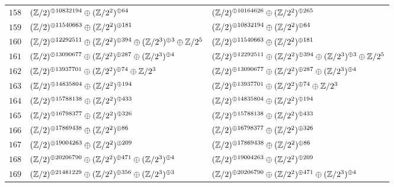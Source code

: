 \begin{supertabular}{|c|p{5.5cm}|p{5.5cm}|}
$158$%
&$(\mathbb{Z}/2)^{\oplus10832194}\oplus(\mathbb{Z}/2^{2})^{\oplus64}$%
&$(\mathbb{Z}/2)^{\oplus10164626}\oplus(\mathbb{Z}/2^{2})^{\oplus265}$\\

$159$%
&$(\mathbb{Z}/2)^{\oplus11540663}\oplus(\mathbb{Z}/2^{2})^{\oplus181}$%
&$(\mathbb{Z}/2)^{\oplus10832194}\oplus(\mathbb{Z}/2^{2})^{\oplus64}$\\

$160$%
&$(\mathbb{Z}/2)^{\oplus12292511}\oplus(\mathbb{Z}/2^{2})^{\oplus394}\oplus(\mathbb{Z}/2^{3})^{\oplus3}\oplus\mathbb{Z}/2^{5}$%
&$(\mathbb{Z}/2)^{\oplus11540663}\oplus(\mathbb{Z}/2^{2})^{\oplus181}$\\

$161$%
&$(\mathbb{Z}/2)^{\oplus13090677}\oplus(\mathbb{Z}/2^{2})^{\oplus287}\oplus(\mathbb{Z}/2^{3})^{\oplus4}$%
&$(\mathbb{Z}/2)^{\oplus12292511}\oplus(\mathbb{Z}/2^{2})^{\oplus394}\oplus(\mathbb{Z}/2^{3})^{\oplus3}\oplus\mathbb{Z}/2^{5}$\\

$162$%
&$(\mathbb{Z}/2)^{\oplus13937701}\oplus(\mathbb{Z}/2^{2})^{\oplus74}\oplus\mathbb{Z}/2^{3}$%
&$(\mathbb{Z}/2)^{\oplus13090677}\oplus(\mathbb{Z}/2^{2})^{\oplus287}\oplus(\mathbb{Z}/2^{3})^{\oplus4}$\\

$163$%
&$(\mathbb{Z}/2)^{\oplus14835804}\oplus(\mathbb{Z}/2^{2})^{\oplus194}$%
&$(\mathbb{Z}/2)^{\oplus13937701}\oplus(\mathbb{Z}/2^{2})^{\oplus74}\oplus\mathbb{Z}/2^{3}$\\

$164$%
&$(\mathbb{Z}/2)^{\oplus15788138}\oplus(\mathbb{Z}/2^{2})^{\oplus433}$%
&$(\mathbb{Z}/2)^{\oplus14835804}\oplus(\mathbb{Z}/2^{2})^{\oplus194}$\\

$165$%
&$(\mathbb{Z}/2)^{\oplus16798377}\oplus(\mathbb{Z}/2^{2})^{\oplus326}$%
&$(\mathbb{Z}/2)^{\oplus15788138}\oplus(\mathbb{Z}/2^{2})^{\oplus433}$\\

$166$%
&$(\mathbb{Z}/2)^{\oplus17869438}\oplus(\mathbb{Z}/2^{2})^{\oplus86}$%
&$(\mathbb{Z}/2)^{\oplus16798377}\oplus(\mathbb{Z}/2^{2})^{\oplus326}$\\

$167$%
&$(\mathbb{Z}/2)^{\oplus19004263}\oplus(\mathbb{Z}/2^{2})^{\oplus209}$%
&$(\mathbb{Z}/2)^{\oplus17869438}\oplus(\mathbb{Z}/2^{2})^{\oplus86}$\\

$168$%
&$(\mathbb{Z}/2)^{\oplus20206790}\oplus(\mathbb{Z}/2^{2})^{\oplus471}\oplus(\mathbb{Z}/2^{3})^{\oplus4}$%
&$(\mathbb{Z}/2)^{\oplus19004263}\oplus(\mathbb{Z}/2^{2})^{\oplus209}$\\

$169$%
&$(\mathbb{Z}/2)^{\oplus21481229}\oplus(\mathbb{Z}/2^{2})^{\oplus356}\oplus(\mathbb{Z}/2^{3})^{\oplus3}$%
&$(\mathbb{Z}/2)^{\oplus20206790}\oplus(\mathbb{Z}/2^{2})^{\oplus471}\oplus(\mathbb{Z}/2^{3})^{\oplus4}$\\


\end{supertabular}
